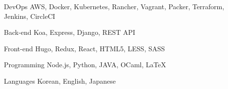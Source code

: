 
\begin{cvskills}

  \cvskill
  {DevOps} %
  {AWS, Docker, Kubernetes, Rancher, Vagrant, Packer, Terraform, Jenkins, CircleCI} %

  \cvskill
  {Back-end} %
  {Koa, Express, Django, REST API} %

  \cvskill
  {Front-end} %
  {Hugo, Redux, React, HTML5, LESS, SASS} %

  \cvskill
  {Programming} %
  {Node.js, Python, JAVA, OCaml, LaTeX} %

  \cvskill
  {Languages} %
  {Korean, English, Japanese} %

\end{cvskills}

